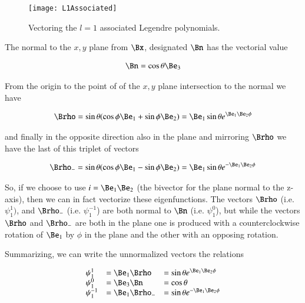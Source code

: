 \begin{figure}[htp]
\centering
\texttt{[image: L1Associated]}
\caption{Vectoring the $l=1$ associated Legendre polynomials.}\label{fig:L1Associated}
\end{figure}

The normal to the $x,y$ plane from $\Bx$, designated $\Bn$ has the vectorial value

\begin{align}\label{eqn:L1Associated:foo3}
\Bn = \cos\theta \Be_3 
\end{align}

From the origin to the point of of the $x,y$ plane intersection to the normal we have

\begin{align}\label{eqn:L1Associated:foo4}
\Brho = \sin\theta (\cos\phi \Be_1 + \sin\phi \Be_2) = \Be_1 \sin\theta e^{\Be_1 \Be_2 \phi}
\end{align}

and finally in the opposite direction also in the plane and mirroring $\Brho$ we have the last of this triplet of vectors

\begin{align}\label{eqn:L1Associated:foo5}
\Brho_{-} = \sin\theta (\cos\phi \Be_1 - \sin\phi \Be_2) = \Be_1 \sin\theta e^{-\Be_1 \Be_2 \phi}
\end{align}

So, if we choose to use $i=\Be_1 \Be_2$ (the bivector for the plane normal to the z-axis), then we can in fact vectorize these eigenfunctions.  The vectors $\Brho$ (i.e. $\psi_1^1)$, and $\Brho_{-}$ (i.e. $\psi_1^{-1}$) are both normal to $\Bn$ (i.e. $\psi_1^0$), but while the vectors $\Brho$ and $\Brho_{-}$ are both in the plane one is produced with a counterclockwise rotation of $\Be_1$ by $\phi$ in the plane and the other with an opposing rotation.

Summarizing, we can write the unnormalized vectors the relations

\begin{equation*}
\begin{array}{l l l}%
\psi_1^1 &= \Be_1 \Brho &= \sin\theta e^{\Be_1\Be_2 \phi} \\
\psi_1^0 &= \Be_3 \Bn &= \cos\theta \\
\psi_1^{-1} &= \Be_1 \Brho_{-} &= \sin\theta e^{-\Be_1\Be_2 \phi}
\end{array}
\end{equation*}


